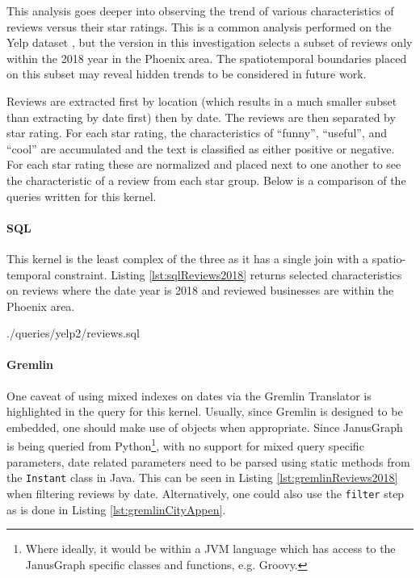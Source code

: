 
This analysis goes deeper into observing the trend of various characteristics of reviews versus their star ratings. This is a common analysis performed on the Yelp dataset \cite{yelpTrendsZhang}, but the version in this investigation selects a subset of reviews only within the 2018 year in the Phoenix area. The spatiotemporal boundaries placed on this subset may reveal hidden trends to be considered in future work.

Reviews are extracted first by location (which results in a much smaller subset than extracting by date first) then by date. The reviews are then separated by star rating. For each star rating, the characteristics of ``funny'', ``useful'', and ``cool'' are accumulated and the text is classified as either positive or negative. For each star rating these are normalized and placed next to one another to see the characteristic of a review from each star group. Below is a comparison of the queries written for this kernel.

\paragraph{SQL}

This kernel is the least complex of the three as it has a single join with a spatio-temporal constraint. Listing \ref{lst:sqlReviews2018} returns selected characteristics on reviews where the date year is 2018 and reviewed businesses are within the Phoenix area.


{./queries/yelp2/reviews.sql}

\paragraph{Gremlin}

One caveat of using mixed indexes on dates via the Gremlin Translator is highlighted in the query for this kernel. Usually, since Gremlin is designed to be embedded, one should make use of objects when appropriate. Since JanusGraph is being queried from Python\footnote{Where ideally, it would be within a JVM language which has access to the JanusGraph specific classes and functions, e.g. Groovy.}, with no support for mixed query specific parameters, date related parameters need to be parsed using static methods from the \texttt{Instant} class in Java. This can be seen in Listing \ref{lst:gremlinReviews2018} when filtering reviews by date. Alternatively, one could also use the \texttt{filter} step as is done in Listing \ref{lst:gremlinCityAppen}.

